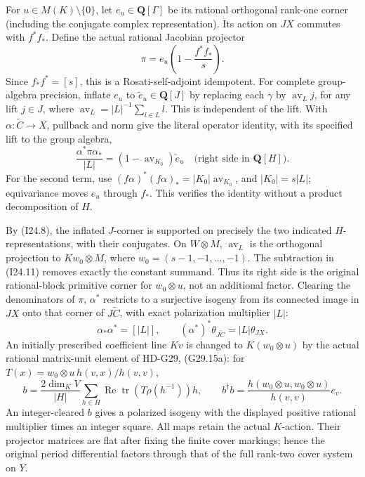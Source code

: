 For \(u\in M(K)\setminus\{0\}\), let \(e_u\in\mathbf Q[\Gamma]\)
be its rational orthogonal rank-one corner (including the conjugate
complex representation). Its action on \(JX\) commutes with
\(f^*f_*\). Define the actual rational Jacobian projector
\[
                \pi=e_u\left(1-\frac{f^*f_*}{s}\right).
                                                               \tag{I24.10}
\]
Since \(f_*f^*=[s]\), this is a Rosati-self-adjoint idempotent.
For complete group-algebra precision, inflate \(e_u\) to
\(\widetilde e_u\in\mathbf Q[J]\) by replacing each
\(\gamma\) by \(\operatorname{av}_L j\), for any lift
\(j\in J\), where \(\operatorname{av}_L=|L|^{-1}\sum_{l\in L}l\).
This is independent of the lift. With \(\alpha:\widetilde C\to X\),
pullback and norm give the literal operator identity, with its
specified lift to the group algebra,
\[
 \frac{\alpha^*\pi\alpha_*}{|L|}
                =(1-\operatorname{av}_{K_0})\widetilde e_u
                     \quad\bigl(\text{right side in }\mathbf Q[H]\bigr).
                                                               \tag{I24.11}
\]
For the second term, use
\((f\alpha)^*(f\alpha)_*=
 |K_0|\operatorname{av}_{K_0}\), and
\(|K_0|=s|L|\); equivariance moves \(e_u\) through \(f_*\).
This verifies the identity without a product decomposition of \(H\).

By (I24.8), the inflated \(J\)-corner is supported on precisely
the two indicated \(H\)-representations, with their conjugates.
On \(W\otimes M\), \(\operatorname{av}_L\) is the orthogonal
projection to
\(Kw_0\otimes M\), where \(w_0=(s-1,-1,\ldots,-1)\).
The subtraction in (I24.11) removes exactly the constant summand.
Thus its right side is the original rational-block primitive
corner for \(w_0\otimes u\), not an additional factor.
Clearing the denominators of \(\pi\), \(\alpha^*\) restricts
to a surjective isogeny from its connected image in \(JX\)
onto that corner of \(J\widetilde C\), with exact polarization
multiplier \(|L|\):
\[
                 \alpha_*\alpha^*=[|L|],\qquad
                 (\alpha^*)^*\theta_{J\widetilde C}
                                      =|L|\theta_{JX}.       \tag{I24.12}
\]
An initially prescribed coefficient line \(Kv\) is changed to
\(K(w_0\otimes u)\) by the actual rational matrix-unit element
of HD-G29, (G29.15a): for \(T(x)=w_0\otimes u\,h(v,x)/h(v,v)\),
\[
 b=\frac{2\dim_K V}{|H|}\sum_{h\in H}
       \operatorname{Re}\operatorname{tr}(T\rho(h^{-1}))h,
 \qquad b^\dagger b=
 \frac{h(w_0\otimes u,w_0\otimes u)}{h(v,v)}e_v.            \tag{I24.13}
\]
An integer-cleared \(b\) gives a polarized isogeny with the
displayed positive rational multiplier times an integer square.
All maps retain the actual \(K\)-action. Their projector matrices
are flat after fixing the finite cover markings; hence the
original period differential factors through that of the full
rank-two cover system on \(Y\).

